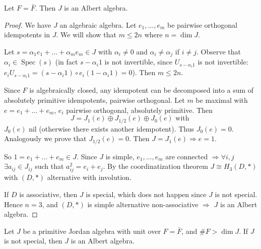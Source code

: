 \documentclass{article}
\begin{document}
\begin{lemma}
Let $F=\bar{F}$. Then $J$ is an Albert algebra.
\end{lemma}

\begin{proof}
We have $J$ an algebraic algebra. Let $e_1,\dots,e_m$ be pairwise orthogonal idempotents in $J$. We will show that $m \leq 2n$ where $n=\dim J$.

Let $s=\alpha_1 e_1+\dots+\alpha_m e_m \in J$ with $\alpha_i \neq 0$ and $\alpha_i \neq \alpha_j$ if $i \neq j$. Observe that $\alpha_i \in \operatorname{Spec}(s)$ (in fact $s-\alpha_i 1$ is not invertible, since $U_{s-\alpha_i 1}$ is not invertible: $e_i U_{s-\alpha_i 1}=(s-\alpha_i 1) \circ e_i (1-\alpha_i 1)=0$). Then $m \leq 2n$.

Since $F$ is algebraically closed, any idempotent can be decomposed into a sum of absolutely primitive idempotents, pairwise orthogonal. Let $m$ be maximal with $e=e_1+\dots+e_m$, $e_i$ pairwise orthogonal, absolutely primitive. Then
\[
J = J_1(e) \oplus J_{1/2}(e) \oplus J_0(e) \text{ with }
\]
$J_0(e)$ nil (otherwise there exists another idempotent). Thus $J_0(e)=0$. Analogously we prove that $J_{1/2}(e)=0$. Then $J=J_1(e) \Rightarrow e=1$.

So $1=e_1+\dots+e_m \in J$. Since $J$ is simple, $e_1,\dots,e_m$ are connected $\Rightarrow \forall i,j$ $\exists a_{ij} \in J_{ij}$ such that $a_{ij}^2=e_i+e_j$. By the coordinatization theorem $J \cong H_3(D,*)$ with $(D,*)$ alternative with involution.

If $D$ is associative, then $J$ is special, which does not happen since $J$ is not special. Hence $n=3$, and $(D,*)$ is simple alternative non-associative $\Rightarrow$ $J$ is an Albert algebra.
\end{proof}

\begin{theorem}
Let $J$ be a primitive Jordan algebra with unit over $F=\bar{F}$, and $\#F > \dim J$. If $J$ is not special, then $J$ is an Albert algebra.
\end{theorem}
\end{document}
